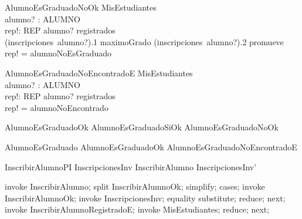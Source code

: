 \begin{schema}{AlumnoEsGraduadoNoOk}
    \Xi MisEstudiantes \\
    alumno? : ALUMNO \\
    rep!: REP
    \where
    alumno? \in registrados \\
    (inscripciones~alumno?).1 \neq maximoGrado \lor (inscripciones~alumno?).2 \neq promueve \\
    rep! = alumnoNoEsGraduado
\end{schema}

\begin{schema}{AlumnoEsGraduadoNoEncontradoE}
    \Xi MisEstudiantes \\
    alumno? : ALUMNO \\
    rep!: REP
    \where
    alumno? \notin registrados \\
    rep! = alumnoNoEncontrado
\end{schema}

\begin{zed}
    AlumnoEsGraduadoOk  AlumnoEsGraduadoSiOk \lor AlumnoEsGraduadoNoOk
\end{zed}
\begin{zed}
    AlumnoEsGraduado  AlumnoEsGraduadoOk \lor AlumnoEsGraduadoNoEncontradoE
\end{zed}


\begin{theorem}{InscribirAlumnoPI}
    InscripcionesInv \land InscribirAlumno \implies InscripcionesInv'
\end{theorem}

\begin{zproof}[InscribirAlumnoPI]
    invoke InscribirAlumno;
    split InscribirAlumnoOk;
    simplify;
    cases;
    invoke InscribirAlumnoOk;
    invoke InscripcionesInv;
    equality substitute;
    reduce;
    next;
    invoke InscribirAlumnoRegistradoE;
    invoke \Xi MisEstudiantes;
    reduce;
    next;
\end{zproof}

